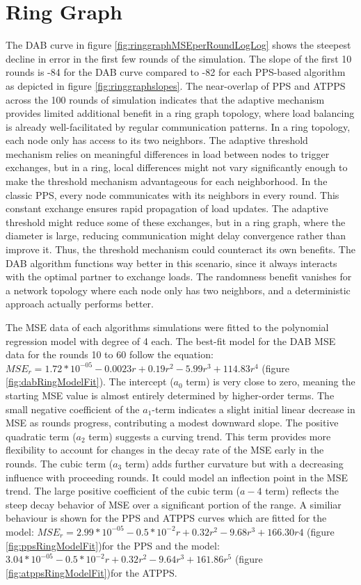 \section{Ring Graph}\label{sec:ringgraph}
The DAB curve in figure \ref{fig:ringgraphMSEperRoundLogLog} shows the steepest decline in error in the first few rounds of the simulation. The slope of the first 10 rounds is -84 for the DAB curve compared to -82 for each PPS-based algorithm as depicted in figure \ref{fig:ringgraphslopes}. The near-overlap of PPS and ATPPS across the 100 rounds of simulation indicates that the adaptive mechanism provides limited additional benefit in a ring graph topology, where load balancing is already well-facilitated by regular communication patterns. In a ring topology, each node only has access to its two neighbors. The adaptive threshold mechanism relies on meaningful differences in load between nodes to trigger exchanges, but in a ring, local differences might not vary significantly enough to make the threshold mechanism advantageous for each neighborhood. In the classic PPS, every node communicates with its neighbors in every round. This constant exchange ensures rapid propagation of load updates. The adaptive threshold might reduce some of these exchanges, but in a ring graph, where the diameter is large, reducing communication might delay convergence rather than improve it. Thus, the threshold mechanism could counteract its own benefits. The DAB algorithm functions way better in this scenario, since it always interacts with the optimal partner to exchange loads. The randomness benefit vanishes for a network topology where each node only has two neighbors, and a deterministic approach actually performs better.

The MSE data of each algorithms simulations were fitted to the polynomial regression model with degree of 4 each. The best-fit model for the DAB MSE data for the rounds 10 to 60 follow the equation: $MSE_r=1.72*10^{-05}-0.0023r+ 0.19r^{2}-5.99r^{3}+114.83r^{4}$ (figure \ref{fig:dabRingModelFit}). The intercept ($a_0$ term) is very close to zero, meaning the starting MSE value is almost entirely determined by higher-order terms. The small negative coefficient of the $a_1$-term indicates a slight initial linear decrease in MSE as rounds progress, contributing a modest downward slope. The positive quadratic term ($a_2$ term) suggests a curving trend. This term provides more flexibility to account for changes in the decay rate of the MSE early in the rounds. The cubic term ($a_3$ term) adds further curvature but with a decreasing influence with proceeding rounds. It could model an inflection point in the MSE trend. The large positive coefficient of the cubic term ($a-4$ term) reflects the steep decay behavior of MSE over a significant portion of the range. A similiar behaviour is shown for the PPS and ATPPS curves which are fitted for the model: $MSE_r= 2.99*10^{-05}-0.5*10^{-2}r + 0.32r^{2} -9.68r^{3} + 166.30r{4}$ (figure \ref{fig:ppsRingModelFit})for the PPS and the model: $3.04*10^{-05}-0.5*10^{-2}r + 0.32r^{2}-9.64r^{3}+161.86r^{5}$ (figure \ref{fig:atppsRingModelFit})for the ATPPS.

